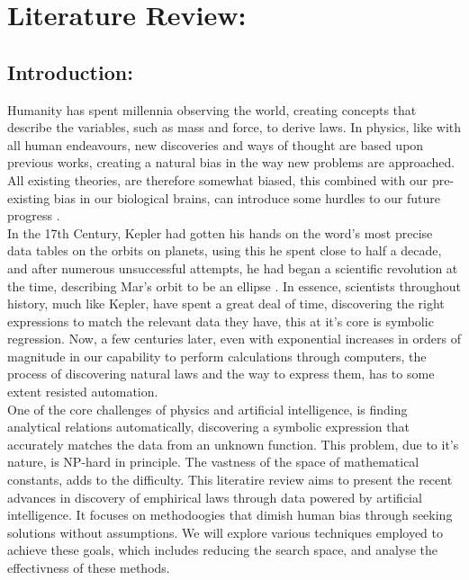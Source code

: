 \documentclass{article}
\begin{document}
\section{Literature Review: }

\subsection{ Introduction: }
  
Humanity has spent millennia observing the world, creating concepts that describe the variables, such as mass and force, to derive laws. In physics, like with
all human endeavours, new discoveries and ways of thought are based upon previous works, creating
a natural bias in the way new problems are approached. All existing theories, are therefore
somewhat biased, this combined with our pre-existing bias in our biological brains, can introduce some
hurdles to our future progress \cite{Wood2022} \cite{Schmidt2009}.\\

In the 17th Century, Kepler had gotten his hands on the word’s most precise data tables on the orbits
on planets, using this he spent close to half a decade, and after numerous unsuccessful
attempts, he had began a scientific revolution at the time, describing Mar’s orbit to be an ellipse \cite{kepler}.
In essence, scientists throughout history, much like Kepler, have spent a great deal of time, discovering
the right expressions to match the relevant data they have, this at it’s core is symbolic regression. Now,
a few centuries later, even with exponential increases in orders of magnitude in our capability to perform
calculations through computers, the process of discovering natural laws and the way to express them,
has to some extent resisted automation.\\


One of the core challenges of physics and artificial intelligence, is finding analytical relations automatically, discovering a symbolic expression that accurately matches the data from an unknown function.
This problem, due to it’s nature, is NP-hard \cite{Hope2023} in principle. The vastness of the space
of mathematical constants, adds to the difficulty. 
This literatire review aims to present the recent advances in discovery of emphirical laws through data powered by artificial intelligence. It focuses on methodoogies that dimish human bias through seeking solutions without assumptions. We will explore various techniques employed to achieve these goals, which includes reducing the search space, and analyse the effectivness of these methods.\\  
\end{document}
